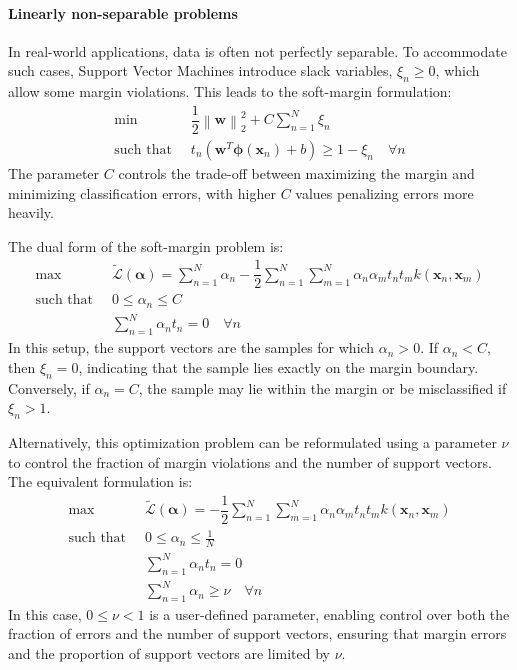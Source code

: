 \paragraph*{Linearly non-separable problems}
In real-world applications, data is often not perfectly separable. 
To accommodate such cases, Support Vector Machines introduce slack variables, $\xi_n \geq 0$, which allow some margin violations. 
This leads to the soft-margin formulation:
\begin{align*}
    \min                      \:&\: \dfrac{1}{2}{\left\lVert \mathbf{w} \right\rVert}_2^2+C\sum_{n=1}^{N}\xi_n         \\
    \text{such that }           &\: t_n\left(\mathbf{w}^T\boldsymbol{\phi}(\mathbf{x}_n)+b\right) \geq 1-\xi_n \quad \forall n       
\end{align*}  
The parameter $C$ controls the trade-off between maximizing the margin and minimizing classification errors, with higher $C$ values penalizing errors more heavily.

The dual form of the soft-margin problem is:
\begin{align*}
    \max                      \:&\: \tilde{\mathcal{L}}(\boldsymbol{\alpha})=\sum_{n=1}^{N}\alpha_n-\dfrac{1}{2}\sum_{n=1}^{N}\sum_{m=1}^N{\alpha_n \alpha_m t_n t_m k(\mathbf{x}_n, \mathbf{x}_m)}         \\
    \text{such that }           &\: 0 \leq \alpha_n \leq C \\
                                &\: \sum_{n=1}^{N}\alpha_n t_n = 0 \quad \forall n
\end{align*}  
In this setup, the support vectors are the samples for which $\alpha_n > 0$.
If $\alpha_n < C$, then $\xi_n = 0$, indicating that the sample lies exactly on the margin boundary.
Conversely, if $\alpha_n = C$, the sample may lie within the margin or be misclassified if $\xi_n > 1$.

Alternatively, this optimization problem can be reformulated using a parameter $\nu$ to control the fraction of margin violations and the number of support vectors.
The equivalent formulation is:
\begin{align*}
    \max                      \:&\: \tilde{\mathcal{L}}(\boldsymbol{\alpha})=-\dfrac{1}{2}\sum_{n=1}^{N}\sum_{m=1}^N{\alpha_n \alpha_m t_n t_m k(\mathbf{x}_n, \mathbf{x}_m)}         \\
    \text{such that }           &\: 0 \leq \alpha_n \leq \frac{1}{N} \\
                                &\: \sum_{n=1}^{N}\alpha_n t_n = 0 \\
                                &\: \sum_{n=1}^{N}\alpha_n\geq \nu \quad \forall n
\end{align*}  
In this case, $0\leq\nu<1$ is a user-defined parameter, enabling control over both the fraction of errors and the number of support vectors, ensuring that margin errors and the proportion of support vectors are limited by $\nu$. 

